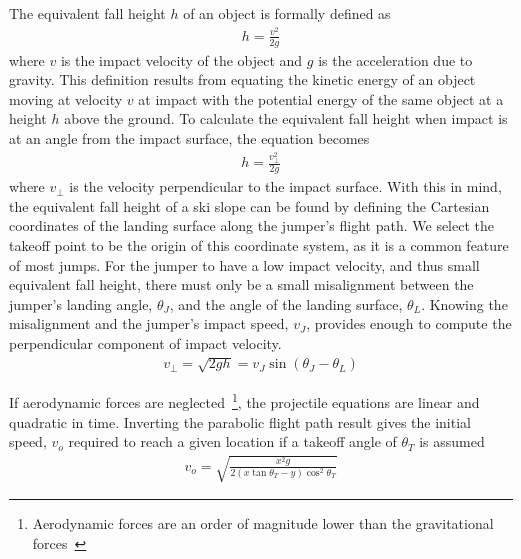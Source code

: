 \documentclass{article}
\begin{document}
The equivalent fall height $h$ of an object is formally defined as
%
\begin{align}
  h = \frac{v^2}{2g}
  \label{eq:efh_general}
\end{align}
%
where $v$ is the impact velocity of the object and $g$ is the acceleration due
to gravity. This definition results from equating the kinetic energy of an
object moving at velocity $v$ at impact with the potential energy of the same
object at a height $h$ above the ground. To calculate the equivalent fall
height when impact is at an angle from the impact surface, the equation becomes
%
\begin{align}
  h = \frac{v_{\perp}^2}{2g}
  \label{eq:efh_slope}
\end{align}
%
where $v_{\perp}$ is the velocity perpendicular to the impact surface. With
this in mind, the equivalent fall height of a ski slope can be found by
defining the Cartesian coordinates of the landing surface along the jumper's flight
path. We select the takeoff point to be the origin of this coordinate system,
as it is a common feature of most jumps.
For the jumper to have a low impact velocity, and thus small equivalent fall
height, there must only be a small misalignment between the jumper's landing angle,
$\theta_J$, and the angle of the landing surface, $\theta_L$. Knowing the
misalignment and the jumper's impact speed, $v_J$, provides enough to compute
the perpendicular component of impact velocity.
%
\begin{align}
  v_{\perp} = \sqrt{2gh} = v_J\sin(\theta_J - \theta_L)
\end{align}

If aerodynamic forces are neglected~\footnote{Aerodynamic forces are an order
of magnitude lower than the gravitational forces~\cite{Hubbard2012}}, the
projectile equations are linear and quadratic in time. Inverting the parabolic
flight path result gives the initial speed, $v_o$ required to reach a given
location if a takeoff angle of $\theta_T$ is assumed
%
\begin{align}
  v_o = \sqrt{\frac{x^2g}{2(x \tan\theta_T - y)\cos^{2}\theta_T}}
\end{align}
\end{document}
